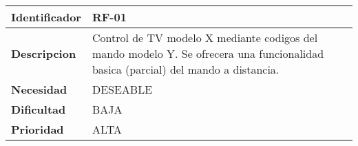 \begin{center}
    \begin{tabular}{|p{2.6cm}|p{12cm}|}
    \hline
    \textbf{Identificador} & RF-01\\
    \hline
    \textbf{Descripcion} & Control de TV modelo X mediante codigos del mando modelo Y. Se ofrecera una funcionalidad basica (parcial) del mando a distancia.\\
    \hline
    \textbf{Necesidad} & DESEABLE\\
    \hline
    \textbf{Dificultad} & BAJA\\
    \hline
    \textbf{Prioridad} & ALTA\\
    \hline
    \end{tabular}
\end{center}
